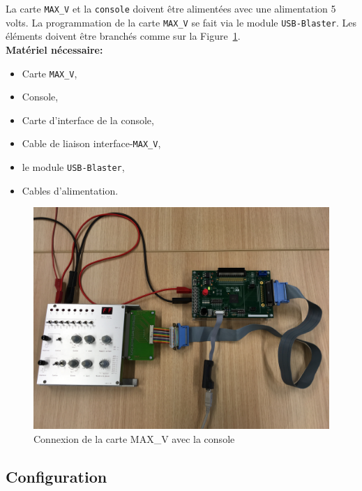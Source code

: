 \documentclass[nosolution]{exercice}
\begin{document}
La carte \texttt{MAX\_V} et la \texttt{console} doivent être alimentées avec une alimentation 5 volts.
La programmation de la carte \texttt{MAX\_V} se fait via le module \texttt{USB-Blaster}.
Les éléments doivent être branchés comme sur la Figure~\ref{fig_connexion}.\\
\textbf{Matériel nécessaire:}
\begin{itemize}
\item Carte \texttt{MAX\_V},
\item Console,
\item Carte d'interface de la console,
\item Cable de liaison interface-\texttt{MAX\_V},
\item le module \texttt{USB-Blaster},
\item Cables d'alimentation.
\end{itemize}

\begin{figure}[H]
\begin{center}
\includegraphics[width=0.95\linewidth]{images/MAXV_branchement.JPG}
\caption{\label{fig_connexion}Connexion de la carte MAX\_V avec la console}
\end{center}
\end{figure}


\subsection{Configuration}
\end{document}
